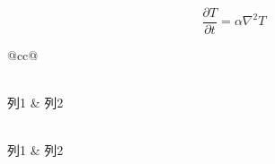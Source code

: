 \documentclass{ctexart}
\begin{document}
\begin{mainmatter}
		
		\begin{equation}
			\frac{\partial T}{\partial t} = \alpha \nabla^2 T
			\label{eq:heat}
		\end{equation}
		
		\begin{longtable}{@{}cc@{}}
			\caption{示例表格} \label{tab:example} \\ %
			\toprule
			列1 & 列2 \\
			\midrule
			\endfirsthead %
			
			 \\ %
			\toprule
			列1 & 列2 \\ %
			\midrule
			\endhead %
			
			\bottomrule
			\endfoot %
			

\end{longtable}
\end{mainmatter}
\end{document}
